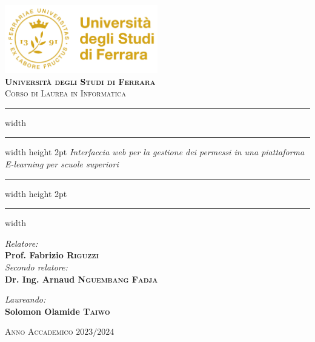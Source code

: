 \documentclass[a4paper, 12pt]{book}
\begin{document}

\begin{titlepage}
  \AddToShipoutPictureBG*{%
    \AtPageLowerLeft{%
      \color{black}\rule{\paperwidth}{\paperheight}%
    }%
  }
  
  \color{Gold}  %
  \centering
  \vspace*{5mm}
  \includegraphics[width=0.5\textwidth]{../images/logo-unife-gold-hires.png}\\
  \vspace*{1cm}
  \huge \textbf{\textsc{Università degli Studi di Ferrara}}\\
  \Large \textsc{Corso di Laurea in Informatica}

  \vspace*{2.5cm}
  \hrule width \hsize \kern 1mm \hrule width \hsize height 2pt
  \vspace*{10mm}
  \Huge \emph{\textnormal{Interfaccia web per la gestione dei permessi in una piattaforma E-learning per scuole superiori}}
  \vspace*{10mm}
  \hrule width \hsize height 2pt
  \vspace*{1mm}
  \hrule width \hsize \kern 1mm

  \vspace*{3.5cm}
  \begin{minipage}{0.45\textwidth}
    \begin{flushleft} \Large
      \emph{Relatore:}\\
      \Large \textbf{Prof. Fabrizio \textsc{Riguzzi}}\\
      \emph{Secondo relatore:}\\
      \Large \textbf{Dr. Ing. Arnaud \textsc{Nguembang Fadja}}
    \end{flushleft}
  \end{minipage}
  \begin{minipage}{0.5\textwidth}
    \begin{flushright} \Large
      \emph{Laureando:} \\
      \Large \textbf{Solomon Olamide \textsc{Taiwo}}
    \end{flushright}
  \end{minipage}

  \vfill %
  \Large \textsc{Anno Accademico $2023/2024$}
\end{titlepage}

\restoregeometry
\end{document}
